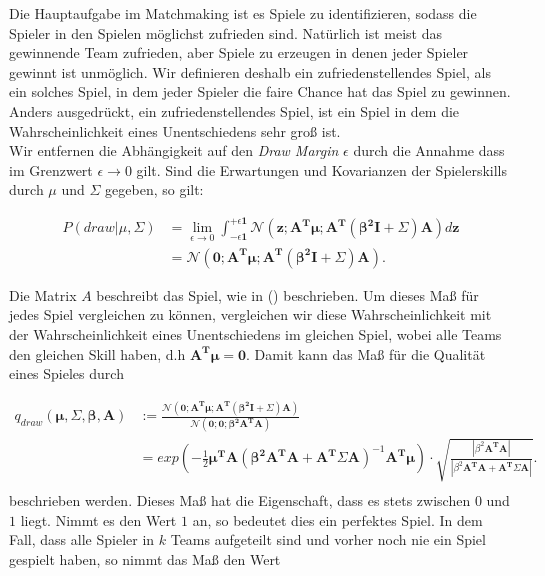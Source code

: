 \documentclass[12pt,a4paper]{scrartcl}
\numberwithin{equation}{section}
\begin{document}
  Die Hauptaufgabe im Matchmaking ist es Spiele zu identifizieren, sodass die Spieler in den Spielen möglichst zufrieden sind. 
  Natürlich ist meist das gewinnende Team zufrieden, aber Spiele zu erzeugen in denen jeder Spieler gewinnt ist unmöglich. 
  Wir definieren deshalb ein zufriedenstellendes Spiel, als ein solches Spiel, in dem jeder Spieler die faire Chance hat das Spiel 
  zu gewinnen. Anders ausgedrückt, ein zufriedenstellendes Spiel, ist ein Spiel in dem die Wahrscheinlichkeit eines Unentschiedens sehr groß ist. \\
  Wir entfernen die Abhängigkeit auf den \textit{Draw Margin} $\epsilon$ durch die Annahme dass im Grenzwert $\epsilon \rightarrow 0$ gilt. 
  Sind die Erwartungen und Kovarianzen der Spielerskills durch $\mu$ und $\varSigma$ gegeben, so gilt: 
  
  \begin{equation}
   \begin{split}
    P(draw| \mu, \varSigma) &= \lim_{\epsilon \rightarrow 0} \int_{- \epsilon \mathbf{1}}^{+ \epsilon \mathbf{1}} \mathcal{N}(\mathbf{z;A^T \mu; A^T (\beta^2 I + \varSigma)A}) d \mathbf{z} \\
    &= \mathcal{N}(\mathbf{0; A^T \mu; A^T(\beta^2 I + \varSigma) A}).
   \end{split}
  \end{equation}
  
  Die Matrix $A$ beschreibt das Spiel, wie in () beschrieben. Um dieses Maß für jedes Spiel vergleichen zu können, vergleichen wir diese Wahrscheinlichkeit mit der Wahrscheinlichkeit
  eines Unentschiedens im gleichen Spiel, wobei alle Teams den gleichen Skill haben, d.h $\mathbf{A^T \mu = 0}$. Damit kann das Maß für die Qualität eines Spieles durch
  
  \begin{equation}
   \begin{split}
    q_{draw}(\mathbf{\mu,\varSigma,\beta,A}) &:= \frac{\mathcal{N}(\mathbf{0;A^T \mu; A^T (\beta^2 I + \varSigma) A})}{\mathcal{N}(\mathbf{0;0; \beta^2 A^T A})} \\
    &= exp(-\frac{1}{2} \mathbf{\mu^T A (\beta^2 A^T A + A^T \varSigma A)}^{-1} \mathbf{A^T \mu}) \cdot \sqrt{ \frac{|\beta^2 \mathbf{A^T A}|}{|\beta^2 \mathbf{A^TA + A^T \varSigma A}|} }. \\
   \end{split}
  \end{equation}
  beschrieben werden.
  Dieses Maß hat die Eigenschaft, dass es stets zwischen $0$ und $1$ liegt. Nimmt es den Wert $1$ an, so bedeutet dies ein perfektes Spiel. In dem Fall, dass alle Spieler
  in $k$ Teams aufgeteilt sind und vorher noch nie ein Spiel gespielt haben, so nimmt das Maß den Wert
  
\end{document}
